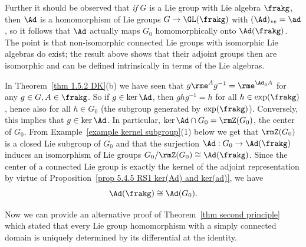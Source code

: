 \begin{example}
    Further it should be observed that \emph{if} $G$ is a Lie group with Lie algebra $\frakg$, then $\Ad$ is a homomorphism of Lie groups $G\to\GL(\frakg)$ with $(\Ad)_{\ast e}=\ad$, so it follows that $\Ad$ actually maps $G_0$ homomorphically onto $\Ad(\frakg)$. The point is that non-isomorphic connected Lie groups with isomorphic Lie algebras do exist; the result above shows that their adjoint groups then are isomorphic and can be defined intrinsically in terms of the Lie algebras.

    In Theorem~\ref{thm 1.5.2 DK}(b) we have seen that $g\rme^A g^{-1}=\rme^{\Ad_g A}$ for any $g\in G,A\in\frakg$. So if $g\in\ker \Ad$, then $ghg^{-1}=h$ for all $h\in \exp(\frakg)$, hence also for all $h\in G_0$ (the subgroup generated by $\exp(\frakg)$). Conversely, this implies that $g\in\ker \Ad$. In particular, $\ker\Ad\cap G_0=\rmZ(G_0)$, the center of $G_0$. From Example~\ref{example kernel subgroup}(1) below we get that $\rmZ(G_0)$ is a closed Lie subgroup of $G_0$ and that the surjection $\Ad:G_0\to \Ad(\frakg)$ induces an isomorphism of Lie groups $G_0\slash \rmZ(G_0)\cong \Ad(\frakg)$. Since the center of a connected Lie group is exactly the kernel of
    the adjoint representation by virtue of Proposition~\ref{prop 5.4.5 RS1 ker(Ad) and ker(ad)}, we have 
    \[\Ad(\frakg)\cong \Ad(G_0).\]
\end{example}


Now we can provide an alternative proof of Theorem~\ref{thm second principle} which stated that every Lie group homomorphism with a simply connected domain is uniquely determined by its differential at the identity.


